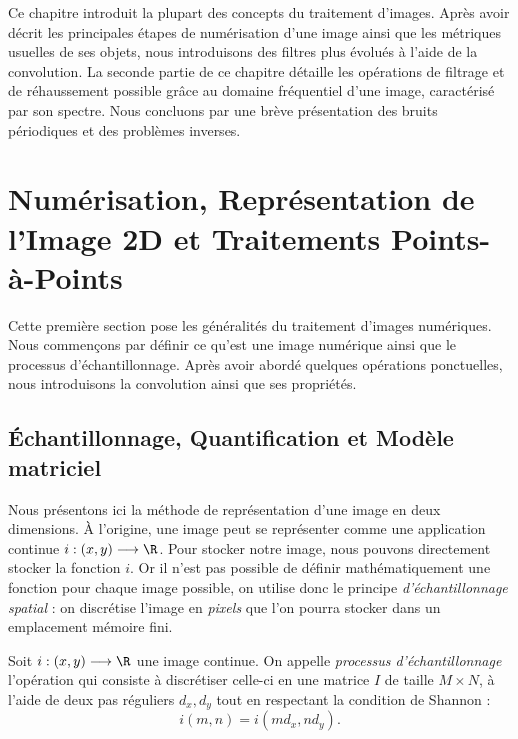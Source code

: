 
\minitoc 

Ce chapitre introduit la plupart des concepts du traitement d'images. Après avoir décrit les principales étapes de numérisation d'une image ainsi que les métriques usuelles de ses objets, nous introduisons des filtres plus évolués à l'aide de la convolution. 
La seconde partie de ce chapitre détaille les opérations de filtrage et de réhaussement possible grâce au domaine fréquentiel d'une image, caractérisé par son spectre. Nous concluons par une brève présentation des bruits périodiques et des problèmes inverses. 


\section{Numérisation, Représentation de l'Image 2D et Traitements Points-à-Points}

Cette première section pose les généralités du traitement d'images numériques. Nous commençons par définir ce qu'est une image numérique ainsi que le processus d'échantillonnage. Après avoir abordé quelques opérations ponctuelles, nous introduisons la convolution ainsi que ses propriétés. 

\subsection{Échantillonnage, Quantification et Modèle matriciel}

Nous présentons ici la méthode de représentation d'une image en deux dimensions. À l'origine, une image peut se représenter comme une application continue $i : (x,y) \longrightarrow \R$. Pour stocker notre image, nous pouvons directement stocker la fonction $i$. Or il n'est pas possible de définir mathématiquement une fonction pour chaque image possible, on utilise donc le principe \emph{d'échantillonnage spatial} : on discrétise l'image en \emph{pixels} que l'on pourra stocker dans un emplacement mémoire fini. 

\begin{definition}
    Soit $i : (x,y) \longrightarrow \R$ une image continue. On appelle \emph{processus d'échantillonnage} l'opération qui consiste à discrétiser celle-ci en une matrice $I$ de taille $ M \times N$, à l'aide de deux pas réguliers $d_x, d_y$ tout en respectant la condition de Shannon : 
    \begin{equation}
        i(m,n) = i(m d_x, n d_y). 
    \end{equation}
\end{definition}

